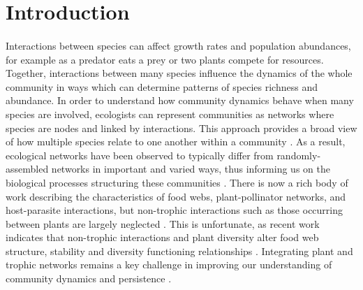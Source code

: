 \documentclass[a4,12pt]{article}
\begin{document}
\newpage
\section{Introduction}
    
    \paragraph{}
    Interactions between species can affect growth rates and population abundances, for example as a predator eats a prey or two plants compete for resources. Together, interactions between many species influence the dynamics of the whole community in ways which can determine patterns of species richness and abundance. In order to understand how community dynamics behave when many species are involved, ecologists can represent communities as networks \parencite{Pimm1978} where species are nodes and linked by interactions. This approach provides a broad view of how multiple species relate to one another within a community \parencite{Kefi2015}. As a result, ecological networks have been observed to typically differ from randomly-assembled networks in important and varied ways, thus informing us on the biological processes structuring these communities \parencite{Dunne2002}. There is now a rich body of work describing the characteristics of food webs, plant-pollinator networks, and host-parasite interactions, but non-trophic interactions such as those occurring between plants are largely neglected \parencite{Ellison2019}. This is unfortunate, as recent work indicates that non-trophic interactions and plant diversity alter food web structure, stability and diversity functioning relationships \parencite{Hammill2015, Giling2019, Zhao2019, Miele2019}. Integrating plant and trophic networks remains a key challenge in improving our understanding of community dynamics and persistence \parencite{Godoy2018c}. 
\end{document}
